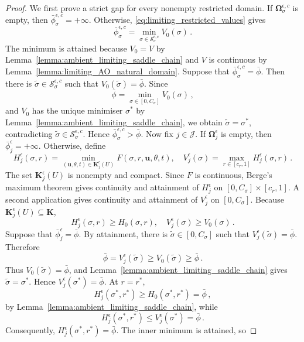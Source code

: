 \documentclass{article}
\theoremstyle{definition}
\newcommand*{\bb}{\boldsymbol}
\def\bu{\bb{u}}
\begin{document}
\begin{bibunit}
\begin{proof}
We first prove a strict gap for every nonempty restricted domain.
If $\bb\Omega_{\sigma}^{\epsilon,c}$ is empty, then
$\bar\phi_{\sigma}^{\epsilon,c}=+\infty$. Otherwise,
\eqref{eq:limiting_restricted_values} gives
$$
    \bar\phi_{\sigma}^{\epsilon,c}
    =
    \underset{\sigma\in\mathcal S_{\sigma}^{\epsilon,c}}{\min}
    V_0(\sigma) \,.
$$
The minimum is attained because $V_0=V$ by
Lemma~\ref{lemma:ambient_limiting_saddle_chain} and $V$ is continuous by
Lemma~\ref{lemma:limiting_AO_natural_domain}. Suppose that
$\bar\phi_{\sigma}^{\epsilon,c}=\bar\phi$. Then there is
$\tilde\sigma\in\mathcal S_{\sigma}^{\epsilon,c}$ such that
$V_0(\tilde\sigma)=\bar\phi$. Since
$$
    \bar\phi
    =
    \underset{\sigma\in[0,C_\sigma]}{\min}V_0(\sigma)\,,
$$
and $V_0$ has the unique minimiser $\sigma^*$ by
Lemma~\ref{lemma:ambient_limiting_saddle_chain}, we obtain
$\tilde\sigma=\sigma^*$, contradicting
$\tilde\sigma\in\mathcal S_{\sigma}^{\epsilon,c}$. Hence
$\bar\phi_{\sigma}^{\epsilon,c}>\bar\phi$.
Now fix $j\in\mathcal J$. If $\bb\Omega_j^\epsilon$ is empty, then
$\bar\phi_j^\epsilon=+\infty$. Otherwise, define
$$
    H_j^\epsilon(\sigma,r)
    =
    \underset{(\bu,\theta,t)\in\bb K_j^\epsilon(U)}{\min}
    F(\sigma,r,\bu,\theta,t),
    \quad
    V_j^\epsilon(\sigma)
    =
    \underset{r\in[c_r,1]}{\max}
    H_j^\epsilon(\sigma,r) \,.
$$
The set $\bb K_j^\epsilon(U)$ is nonempty and compact. Since $F$ is
continuous, Berge's maximum theorem gives continuity and attainment of
$H_j^\epsilon$ on
$[0,C_\sigma]\times[c_r,1]$. A second application gives continuity and
attainment of $V_j^\epsilon$ on $[0,C_\sigma]$. Because
$\bb K_j^\epsilon(U)\subseteq\bb K$,
$$
    H_j^\epsilon(\sigma,r)
    \geq
    H_0(\sigma,r),
    \quad
    V_j^\epsilon(\sigma)
    \geq
    V_0(\sigma) \,.
$$
Suppose that $\bar\phi_j^\epsilon=\bar\phi$. By attainment, there is
$\tilde\sigma\in[0,C_\sigma]$ such that
$V_j^\epsilon(\tilde\sigma)=\bar\phi$. Therefore
$$
    \bar\phi
    =
    V_j^\epsilon(\tilde\sigma)
    \geq
    V_0(\tilde\sigma)
    \geq
    \bar\phi \,.
$$
Thus $V_0(\tilde\sigma)=\bar\phi$, and
Lemma~\ref{lemma:ambient_limiting_saddle_chain} gives
$\tilde\sigma=\sigma^*$. Hence
$V_j^\epsilon(\sigma^*)=\bar\phi$. At $r=r^*$,
$$
    H_j^\epsilon(\sigma^*,r^*)
    \geq
    H_0(\sigma^*,r^*)
    =
    \bar\phi\,,
$$
by Lemma~\ref{lemma:ambient_limiting_saddle_chain}, while
$$
    H_j^\epsilon(\sigma^*,r^*)
    \leq
    V_j^\epsilon(\sigma^*)
    =
    \bar\phi \,.
$$
Consequently,
$H_j^\epsilon(\sigma^*,r^*)=\bar\phi$. The inner minimum is attained, so

\end{proof}
\end{bibunit}
\end{document}
